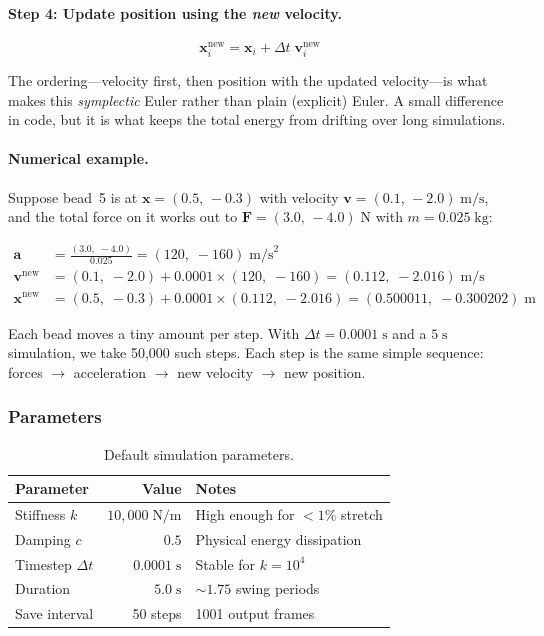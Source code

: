 \documentclass[11pt,a4paper]{article}
\begin{document}
\paragraph{Step 4: Update position using the \emph{new} velocity.}
\begin{equation}
    \mathbf{x}_i^{\text{new}}
    = \mathbf{x}_i + \Delta t \;\mathbf{v}_i^{\text{new}}
\end{equation}

The ordering---velocity first, then position with the updated velocity---is
what makes this \emph{symplectic} Euler rather than plain (explicit) Euler.
A small difference in code, but it is what keeps the total energy from
drifting over long simulations.

\paragraph{Numerical example.}
Suppose bead~5 is at $\mathbf{x} = (0.5,\, -0.3)$ with velocity
$\mathbf{v} = (0.1,\, -2.0)\;\text{m/s}$, and the total force on it works
out to $\mathbf{F} = (3.0,\, -4.0)\;\text{N}$ with
$m = 0.025\;\text{kg}$:

\begin{align}
    \mathbf{a}
      &= \frac{(3.0,\;-4.0)}{0.025}
       = (120,\;-160)\;\text{m/s}^2 \\[6pt]
    \mathbf{v}^{\text{new}}
      &= (0.1,\;-2.0) + 0.0001 \times (120,\;-160)
       = (0.112,\;-2.016)\;\text{m/s} \\[6pt]
    \mathbf{x}^{\text{new}}
      &= (0.5,\;-0.3) + 0.0001 \times (0.112,\;-2.016)
       = (0.500011,\;-0.300202)\;\text{m}
\end{align}

Each bead moves a tiny amount per step. With $\Delta t = 0.0001\;\text{s}$
and a $5\;\text{s}$ simulation, we take 50{,}000 such steps. Each step is
the same simple sequence: forces $\to$ acceleration $\to$ new velocity
$\to$ new position.

\subsubsection{Parameters}

\begin{table}[H]
\centering
\begin{tabular}{lrl}
\toprule
Parameter & Value & Notes \\
\midrule
Stiffness $k$ & $10{,}000\;\text{N/m}$ & High enough for $<1\%$ stretch \\
Damping $c$ & $0.5$ & Physical energy dissipation \\
Timestep $\Delta t$ & $0.0001\;\text{s}$ & Stable for $k=10^4$ \\
Duration & $5.0\;\text{s}$ & ${\sim}1.75$ swing periods \\
Save interval & 50 steps & 1001 output frames \\
\bottomrule
\end{tabular}
\caption{Default simulation parameters.}
\label{tab:params}
\end{table}
\end{document}
